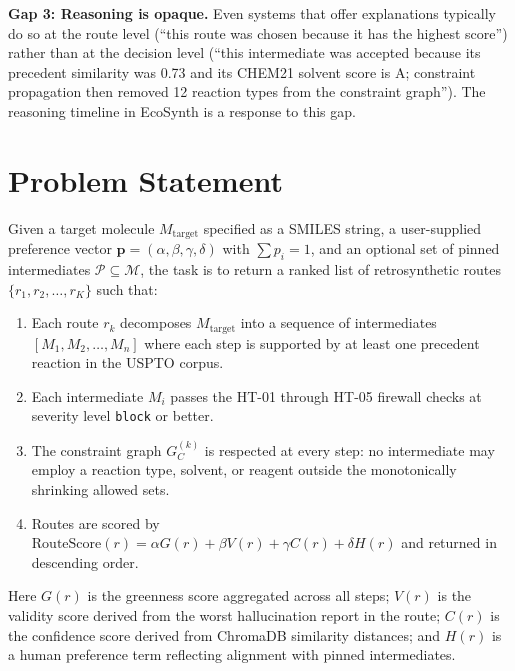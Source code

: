 \documentclass[12pt,a4paper]{article}
\begin{document}
\textbf{Gap 3: Reasoning is opaque.}
Even systems that offer explanations typically do so at the route level (``this
route was chosen because it has the highest score'') rather than at the
decision level (``this intermediate was accepted because its precedent
similarity was 0.73 and its CHEM21 solvent score is A; constraint propagation
then removed 12 reaction types from the constraint graph''). The reasoning
timeline in EcoSynth is a response to this gap.

\section{Problem Statement}

Given a target molecule $M_{\text{target}}$ specified as a SMILES string, a
user-supplied preference vector $\mathbf{p} = (\alpha, \beta, \gamma, \delta)$
with $\sum p_i = 1$, and an optional set of pinned intermediates
$\mathcal{P} \subseteq \mathcal{M}$, the task is to return a ranked list of
retrosynthetic routes $\{r_1, r_2, \ldots, r_K\}$ such that:

\begin{enumerate}[label=(\roman*)]
  \item Each route $r_k$ decomposes $M_{\text{target}}$ into a sequence of
        intermediates $[M_1, M_2, \ldots, M_n]$ where each step is supported
        by at least one precedent reaction in the USPTO corpus.
  \item Each intermediate $M_i$ passes the HT-01 through HT-05 firewall
        checks at severity level \texttt{block} or better.
  \item The constraint graph $G_C^{(k)}$ is respected at every step: no
        intermediate may employ a reaction type, solvent, or reagent outside
        the monotonically shrinking allowed sets.
  \item Routes are scored by $\text{RouteScore}(r) = \alpha G(r) + \beta V(r)
        + \gamma C(r) + \delta H(r)$ and returned in descending order.
\end{enumerate}

Here $G(r)$ is the greenness score aggregated across all steps; $V(r)$ is
the validity score derived from the worst hallucination report in the route;
$C(r)$ is the confidence score derived from ChromaDB similarity distances;
and $H(r)$ is a human preference term reflecting alignment with pinned
intermediates.

\end{document}
